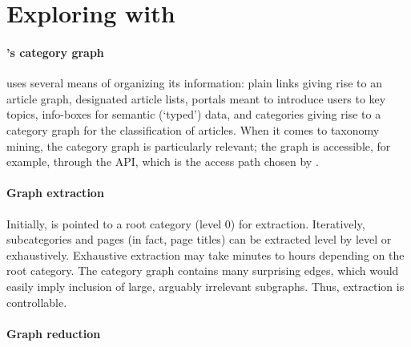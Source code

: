 
\section{Exploring \Wikipedia{} with \WikiTax} 
\label{S:approach}


\vspace{-27\in}

\paragraph*{\textbf{\Wikipedia's category graph}}

\Wikipedia{} uses several means of organizing its information: plain
links giving rise to an article graph, designated article lists,
portals meant to introduce users to key topics, info-boxes for
semantic (`typed') data, and categories giving rise to a category
graph for the classification of articles. When it comes to taxonomy
mining, the category graph is particularly relevant; the graph is
accessible, for example, through the \MediaWiki{} API, which is the
access path chosen by \WikiTax.



\vspace{-27\in}

\paragraph*{\textbf{Graph extraction}}

Initially, \WikiTax{} is pointed to a root category (level 0) for
extraction. Iteratively, subcategories and pages (in fact, page
titles) can be extracted level by level or exhaustively. Exhaustive
extraction may take minutes to hours depending on the root
category. The \Wikipedia{} category graph contains many surprising
edges, which would easily imply inclusion of large, arguably
irrelevant subgraphs. Thus, extraction is controllable.


\vspace{-27\in}

\paragraph*{\textbf{Graph reduction}}

